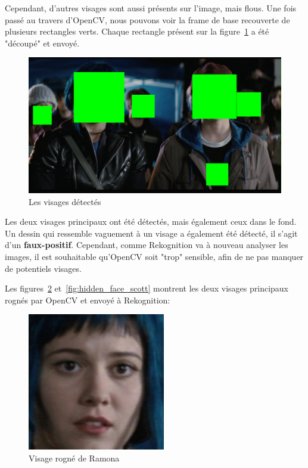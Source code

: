 Cependant, d'autres visages sont aussi présents sur l'image, mais flous. 
Une fois passé au travers d'OpenCV, nous pouvons voir la frame de base recouverte de plusieurs rectangles verts.
Chaque rectangle présent sur la figure~\ref{fig:hidden_face} a été "découpé" et envoyé.

\begin{figure}[H]
	\centering
	\includegraphics[width=12cm]{images/facial_reco/hidden_face.png}
    \caption{Les visages détectés}
	\label{fig:hidden_face}
\end{figure}

Les deux visages principaux ont été détectés, mais également ceux dans le fond.
Un dessin qui ressemble vaguement à un visage a également été détecté, il s'agit d'un \textbf{faux-positif}.
Cependant, comme Rekognition va à nouveau analyser les images, il est souhaitable qu'OpenCV
soit "trop" sensible, afin de ne pas manquer de potentiels visages.

Les figures~\ref{fig:hidden_face_ramona} et~\ref{fig:hidden_face_scott} montrent les deux visages principaux rognés par OpenCV et envoyé à Rekognition:

\begin{figure}[H]
	\centering
	\includegraphics[width=6cm]{images/facial_reco/ramona.png}
    \caption{Visage rogné de Ramona}
	\label{fig:hidden_face_ramona}
\end{figure}

